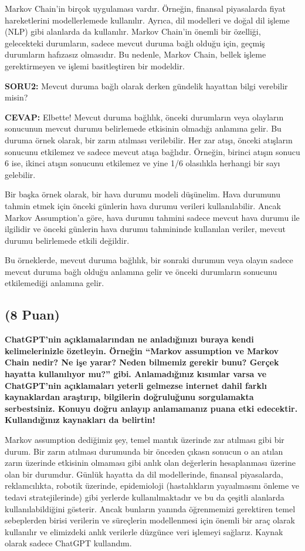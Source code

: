 \documentclass[11pt]{article}
\begin{document}
Markov Chain'in birçok uygulaması vardır. Örneğin, finansal piyasalarda fiyat hareketlerini modellerlemede kullanılır. Ayrıca, dil modelleri ve doğal dil işleme (NLP) gibi alanlarda da kullanılır. Markov Chain'in önemli bir özelliği, gelecekteki durumların, sadece mevcut duruma bağlı olduğu için, geçmiş durumların hafızasız olmasıdır. Bu nedenle, Markov Chain, bellek işleme gerektirmeyen ve işlemi basitleştiren bir modeldir.

\textbf{SORU2:} Mevcut duruma bağlı olarak derken gündelik hayattan bilgi verebilir misin?

\textbf{CEVAP:} Elbette! Mevcut duruma bağlılık, önceki durumların veya olayların sonucunun mevcut durumu belirlemede etkisinin olmadığı anlamına gelir. Bu duruma örnek olarak, bir zarın atılması verilebilir. Her zar atışı, önceki atışların sonucunu etkilemez ve sadece mevcut atışa bağlıdır. Örneğin, birinci atışın sonucu 6 ise, ikinci atışın sonucunu etkilemez ve yine 1/6 olasılıkla herhangi bir sayı gelebilir.

Bir başka örnek olarak, bir hava durumu modeli düşünelim. Hava durumunu tahmin etmek için önceki günlerin hava durumu verileri kullanılabilir. Ancak Markov Assumption'a göre, hava durumu tahmini sadece mevcut hava durumu ile ilgilidir ve önceki günlerin hava durumu tahmininde kullanılan veriler, mevcut durumu belirlemede etkili değildir.

Bu örneklerde, mevcut duruma bağlılık, bir sonraki durumun veya olayın sadece mevcut duruma bağlı olduğu anlamına gelir ve önceki durumların sonucunu etkilemediği anlamına gelir.

\subsection{(8 Puan)} \textbf{ChatGPT’nin açıklamalarından ne anladığınızı buraya kendi kelimelerinizle özetleyin. Örneğin ``Markov assumption ve Markov Chain nedir? Ne işe yarar? Neden bilmemiz gerekir bunu? Gerçek hayatta kullanılıyor mu?'' gibi. Anlamadığınız kısımlar varsa ve ChatGPT’nin açıklamaları yeterli gelmezse internet dahil farklı kaynaklardan araştırıp, bilgilerin doğruluğunu sorgulamakta serbestsiniz. Konuyu doğru anlayıp anlamamanız puana etki edecektir. Kullandığınız kaynakları da belirtin!}

Markov assumption dediğimiz şey, temel mantık üzerinde zar atılması gibi bir durum. Bir zarın atılması durumunda bir önceden çıkasn sonucun o an atılan zarın üzerinde etkisinin olmaması gibi anlık olan değerlerin hesaplanması üzerine olan bir durumdur. Günlük hayatta da dil modellerinde, finansal piyasalarda, reklamcılıkta, robotik üzerinde, epidemioloji (hastalıkların yayaılmasını önleme ve tedavi stratejilerinde) gibi yerlerde kullanılmaktadır ve bu da çeşitli alanlarda kullanılabildiğini gösterir. Ancak bunların yanında öğrenmemizi gerektiren temel sebeplerden birisi verilerin ve süreçlerin modellenmesi için önemli bir araç olarak kullanılır ve elimizdeki anlık verilerle düzgünce veri işlemeyi sağlarız. Kaynak olarak sadece ChatGPT kullandım.
\end{document}
